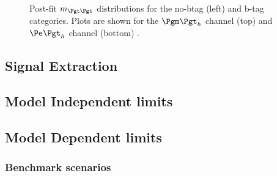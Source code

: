 \begin{figure}[tbh]
\caption{Post-fit $m_{\Pgt\Pgt}$ distributions for the no-btag
(left) and b-tag categories. Plots are shown for
the $\mutau$ channel (top) and $\etau$ channel (bottom) \cite{}.}
\label{fig:mssmpostfitmass}
\end{figure}



\subsection{Signal Extraction}

\subsection{Model Independent limits}

\subsection{Model Dependent limits}

\subsubsection{Benchmark scenarios}




